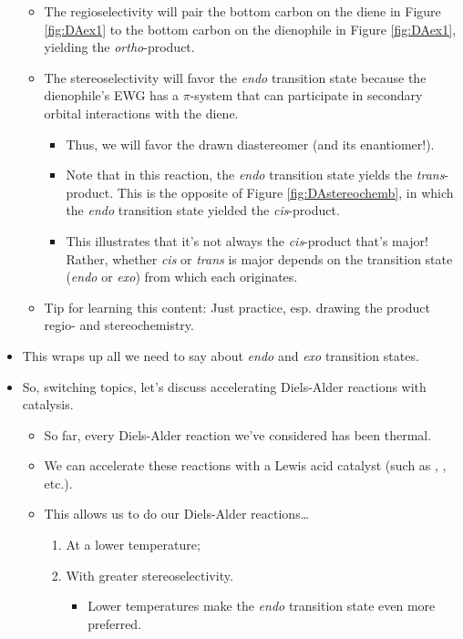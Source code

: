 \documentclass[../notes.tex]{subfiles}
\begin{document}
\begin{itemize}
\begin{itemize}
        \item The regioselectivity will pair the bottom carbon on the diene in Figure \ref{fig:DAex1} to the bottom carbon on the dienophile in Figure \ref{fig:DAex1}, yielding the \emph{ortho}-product.
        \item The stereoselectivity will favor the \emph{endo} transition state because the dienophile's EWG has a $\pi$-system that can participate in secondary orbital interactions with the diene.
        \begin{itemize}
            \item Thus, we will favor the drawn diastereomer (and its enantiomer!).
            \item Note that in this reaction, the \emph{endo} transition state yields the \emph{trans}-product. This is the opposite of Figure \ref{fig:DAstereochemb}, in which the \emph{endo} transition state yielded the \emph{cis}-product.
            \item This illustrates that it's not always the \emph{cis}-product that's major! Rather, whether \emph{cis} or \emph{trans} is major depends on the transition state (\emph{endo} or \emph{exo}) from which each originates.
        \end{itemize}
        \item Tip for learning this content: Just practice, esp. drawing the product regio- and stereochemistry.
    \end{itemize}
    \item This wraps up all we need to say about \emph{endo} and \emph{exo} transition states.
    \item So, switching topics, let's discuss accelerating Diels-Alder reactions with catalysis.
    \begin{itemize}
        \item So far, every Diels-Alder reaction we've considered has been thermal.
        \item We can accelerate these reactions with a Lewis acid catalyst (such as , , etc.).
        \item This allows us to do our Diels-Alder reactions\dots
        \begin{enumerate}
            \item At a lower temperature;
            \item With greater stereoselectivity.
            \begin{itemize}
                \item Lower temperatures make the \emph{endo} transition state even more preferred.

\end{itemize}
\end{enumerate}
\end{itemize}
\end{itemize}
\end{document}

